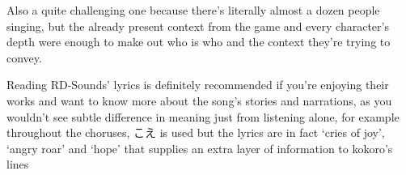 \documentclass{article}
\begin{document}
Also a quite challenging one because there's literally almost a dozen people singing, but the already present context from the game and every character's depth were enough to make out who is who and the context they're trying to convey.

Reading RD-Sounds' lyrics is definitely recommended if you're enjoying their works and want to know more about the song's stories and narrations, as you wouldn't see subtle difference in meaning just from listening alone, for example throughout the choruses, こえ is used but the lyrics are in fact `cries of joy', `angry roar' and `hope' that supplies an extra layer of information to kokoro's lines
\end{document}
